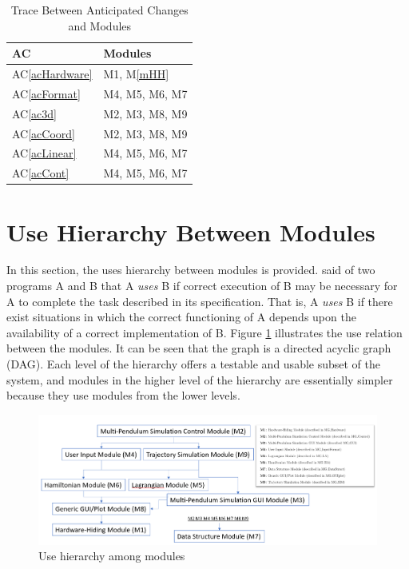 \documentclass[12pt, titlepage]{article}
\newcommand{\acref}[1]{AC\ref{#1}}
\newcommand{\mref}[1]{M\ref{#1}}
\begin{document}
\begin{table}[H]
\centering
\begin{tabular}{p{} p{}}
\toprule
\textbf{AC} & \textbf{Modules}\\
\midrule
\acref{acHardware} & M1, \mref{mHH}\\
\acref{acFormat} & M4, M5, M6, M7\\%
\acref{ac3d} & M2, M3, M8, M9\\%
\acref{acCoord} & M2, M3, M8, M9\\%
\acref{acLinear} & M4, M5, M6, M7\\%
\acref{acCont} & M4, M5, M6, M7\\%
\bottomrule
\end{tabular}
\caption{Trace Between Anticipated Changes and Modules}
\label{TblACT}
\end{table}

\section{Use Hierarchy Between Modules} \label{SecUse}

In this section, the uses hierarchy between modules is
provided. \citet{Parnas1978} said of two programs A and B that A {\em uses} B if
correct execution of B may be necessary for A to complete the task described in
its specification. That is, A {\em uses} B if there exist situations in which
the correct functioning of A depends upon the availability of a correct
implementation of B.  Figure \ref{FigUH} illustrates the use relation between
the modules. It can be seen that the graph is a directed acyclic graph
(DAG). Each level of the hierarchy offers a testable and usable subset of the
system, and modules in the higher level of the hierarchy are essentially simpler
because they use modules from the lower levels.

\begin{figure}[H]
\centering
\includegraphics[width=1.0\textwidth]{figure1.PNG}
\caption{Use hierarchy among modules}
\label{FigUH}
\end{figure}
\end{document}
